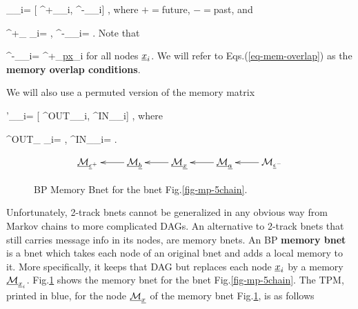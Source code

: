 \beq
\calm_{\rvx_i}=
[
\calm^+_{\rvx_i},
\calm^-_{\rvx_i}]
\;,
\eeq
where $+=$future, $-=$past, and

\beq
\calm^+_{ \rvx_i}=
\;,
\;\;\;
\calm^-_{\rvx_i}=
\;.
\eeq
Note that

\beq
\calm^-_{\rvx_i}=
\calm^+_{\ul{px}_i}
\label{eq-mem-overlap}
\eeq
for all nodes $\rvx_i$.
We will refer to
Eqs.(\ref{eq-mem-overlap}) as
the {\bf memory overlap
conditions}.

We will also use a permuted version of the
memory matrix

\beq
\calm'_{\rvx_i}=
[
\calm^{OUT}_{\rvx_i},
\calm^{IN}_{\rvx_i}]
\;,
\eeq
where

\beq
\calm^{OUT}_{ \rvx_i}=
\;,
\;\;\;
\calm^{IN}_{\rvx_i}=
\;.
\eeq

\begin{figure}[h!]
$$\xymatrix{
\ucalm_{\rveps^+}
&
\ucalm_\rvb\ar[l]
&
\ucalm_\rvx\ar[l]
&
\ucalm_\rva\ar[l]
&
\calm_{\rveps^-}\ar[l]
}$$
\caption{BP Memory Bnet for the bnet
Fig.\ref{fig-mp-5chain}. }
\label{fig-mem-5chain}
\end{figure}

Unfortunately,
2-track bnets cannot be
 generalized in any
obvious way  from
Markov chains to more
complicated DAGs.
An alternative to 2-track bnets
that still
carries message
info in its nodes,
are memory bnets. An BP
{\bf memory bnet}
is a bnet
which takes each node
of an original
bnet and
adds a local memory to it.
More specifically,
it keeps that DAG
but replaces each node
$\rvx_i$
by a memory $\ucalm_{\rvx_i}$.
Fig.\ref{fig-mem-5chain} shows
the memory bnet for
the bnet Fig.\ref{fig-mp-5chain}.
The TPM, printed in blue,
for the  node $\ucalm_\rvx$
of the memory bnet
Fig.\ref{fig-mem-5chain}, is as follows

